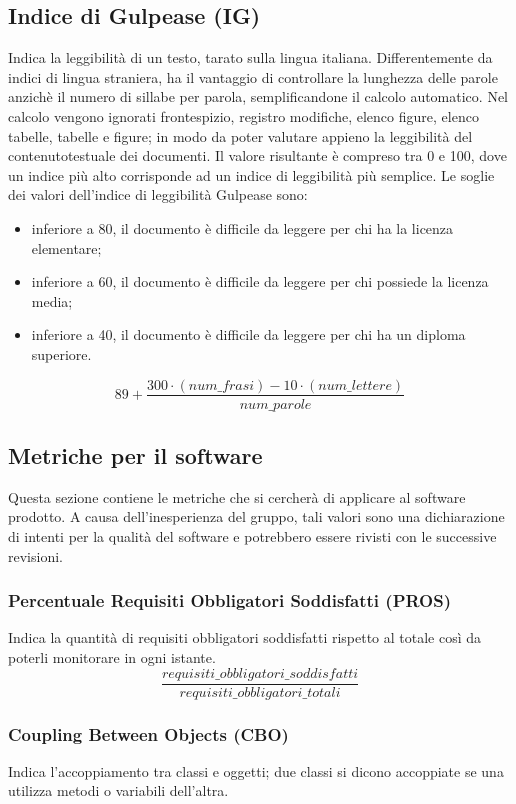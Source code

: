 \subsection{Indice di Gulpease (IG)}
Indica la leggibilità di un testo, tarato sulla lingua italiana. Differentemente da indici di lingua straniera, ha il vantaggio di controllare la lunghezza delle parole anzichè il numero di sillabe per parola, semplificandone il calcolo automatico. 
Nel calcolo vengono ignorati frontespizio, registro modifiche, elenco figure, elenco tabelle, tabelle e figure; in modo da poter valutare appieno la leggibilità del contenutotestuale dei documenti.
Il valore risultante è compreso tra 0 e 100, dove un indice più alto corrisponde ad un indice di leggibilità più semplice.
Le soglie dei valori dell’indice di leggibilità Gulpease sono:
\begin{itemize}
    \item inferiore a 80, il documento è difficile da leggere per chi ha la licenza elementare;
    \item inferiore a 60, il documento è difficile da leggere per chi possiede la licenza media;
    \item inferiore a 40, il documento è difficile da leggere per chi ha un diploma superiore.
\end{itemize}
\[
    89+ \frac{300\cdot (num\_frasi) - 10\cdot (num\_lettere)}{num\_parole}
\]

\subsection{Metriche per il software}
Questa sezione contiene le metriche che si cercherà di applicare al software prodotto. A causa dell’inesperienza del gruppo, tali valori sono una dichiarazione di intenti per la qualità del software e potrebbero essere rivisti con le successive revisioni.

\subsubsection{Percentuale Requisiti Obbligatori Soddisfatti (PROS)}
Indica la quantità di requisiti obbligatori soddisfatti rispetto al totale così da poterli monitorare in ogni istante.
\[\frac{requisiti\_obbligatori\_soddisfatti}{requisiti\_obbligatori\_totali}\]

\subsubsection{Coupling Between Objects (CBO)}
Indica l'accoppiamento tra classi e oggetti; due classi si dicono accoppiate se una utilizza metodi o variabili dell'altra.

